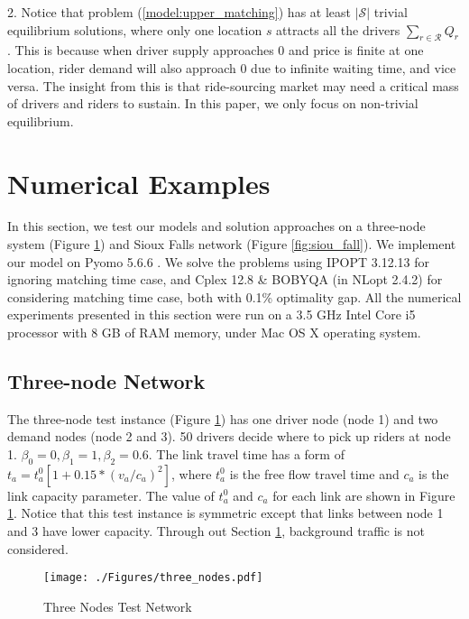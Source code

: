 \documentclass[review]{elsarticle}
\begin{document}
2. Notice that problem (\ref{model:upper_matching}) has at least $|\mathcal{S}|$ trivial equilibrium solutions, where only one location $s$ attracts all the drivers $\sum_{r \in \mathcal{R}} Q_r$. This is because when driver supply approaches 0 and price is finite at one location, rider demand will also approach 0 due to infinite waiting time, and vice versa. The insight from this is that ride-sourcing market may need a critical mass of drivers and riders to sustain. In this paper, we only focus on non-trivial equilibrium. 

\section{Numerical Examples} \label{sec:nume}
In this section, we test our models and solution approaches on a three-node system (Figure \ref{fig:three_nodes}) and Sioux Falls network (Figure \ref{fig:siou_fall}). We implement our model on Pyomo 5.6.6 \citep{hart2017pyomo}. We solve the problems using IPOPT 3.12.13 \citep{wachter2009short} for ignoring matching time case, and Cplex 12.8 \& BOBYQA (in NLopt 2.4.2) for considering matching time case, both with 0.1\% optimality gap. All the numerical experiments presented in this section were run on a 3.5 GHz Intel Core i5 processor with 8 GB of RAM memory, under Mac OS X operating system. 

\subsection{Three-node Network}
The three-node test instance (Figure \ref{fig:three_nodes}) has one driver node (node 1) and two demand nodes (node 2 and 3). 50 drivers decide where to pick up riders at node 1. $\beta_0 = 0, \beta_1 = 1, \beta_2 = 0.6$. The link travel time has a form of $t_a = t_a^0[1+0.15*(v_a/c_a)^2]$, where $t_a^0$ is the free flow travel time and $c_a$ is the link capacity parameter. The value of $t_a^0$ and $c_a$ for each link are shown in Figure \ref{fig:three_nodes}. Notice that this test instance is symmetric except that links between node 1 and 3 have lower capacity. Through out Section \ref{sec:nume}, background traffic is not considered. 

\begin{figure}[htbp]
\begin{center}
    \texttt{[image: ./Figures/three\_nodes.pdf]}
\caption{Three Nodes Test Network}
\label{fig:three_nodes}
\end{center}
\end{figure}
\end{document}
